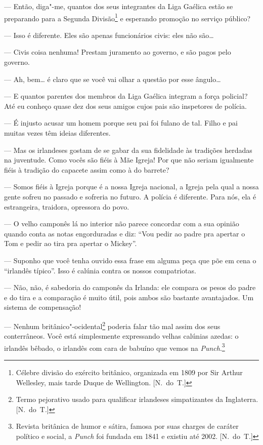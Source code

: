 --- Então, diga"-me, quantos dos seus integrantes da Liga Gaélica
estão se preparando para a Segunda Divisão\footnote{ Célebre divisão do
exército britânico, organizada em 1809 por Sir Arthur Wellesley, mais
tarde Duque de Wellington. [N.~do~T.]} e esperando promoção no serviço
público?

--- Isso é diferente.  Eles são apenas funcionários civis: eles
não são\ldots{}

--- Civis coisa nenhuma!  Prestam juramento ao governo, e são
pagos pelo governo.

--- Ah, bem\ldots{} é claro que se você vai olhar a questão por esse
ângulo\ldots{}

--- E quantos parentes dos membros da Liga Gaélica integram a
força policial?  Até eu conheço quase dez dos seus amigos cujos pais
são inspetores de polícia.

--- É injusto acusar um homem porque seu pai foi fulano de tal.
Filho e pai muitas vezes têm ideias diferentes.

--- Mas os irlandeses gostam de se gabar da sua fidelidade às
tradições herdadas na juventude.  \label{como"-voces} Como vocês são fiéis à Mãe Igreja!
Por que não seriam igualmente fiéis à tradição do capacete assim como à
do barrete?

--- Somos fiéis à Igreja porque é a nossa Igreja nacional, a
Igreja pela qual a nossa gente sofreu no passado e sofreria no futuro.
A polícia é diferente.  Para nós, ela é estrangeira, traidora,
opressora do povo.

--- O velho camponês lá no interior não parece concordar com a
sua opinião quando conta as notas engorduradas e diz: “Vou pedir ao
padre pra apertar o Tom e pedir ao tira pra apertar o
Mickey”.

--- Suponho que você tenha ouvido essa frase em alguma peça que
põe em cena o “irlandês típico”.  Isso é calúnia contra os nossos
compatriotas.

--- Não, não, é sabedoria do camponês da Irlanda: ele compara os
pesos do padre e do tira e a comparação é muito útil, pois ambos são
bastante avantajados.  Um sistema de compensação!

--- Nenhum britânico"-ocidental\footnote{ Termo pejorativo usado
para qualificar irlandeses simpatizantes da Inglaterra. [N.~do~T.]}
poderia falar tão mal assim dos seus conterrâneos.  Você está
simplesmente expressando velhas calúnias azedas: o irlandês bêbado, o
irlandês com cara de babuíno que vemos na \textit{Punch}.\footnote{
Revista britânica de humor e sátira, famosa por suas charges de caráter
político e social, a \textit{Punch} foi fundada em 1841 e existiu até
2002. [N.~do~T.]}

